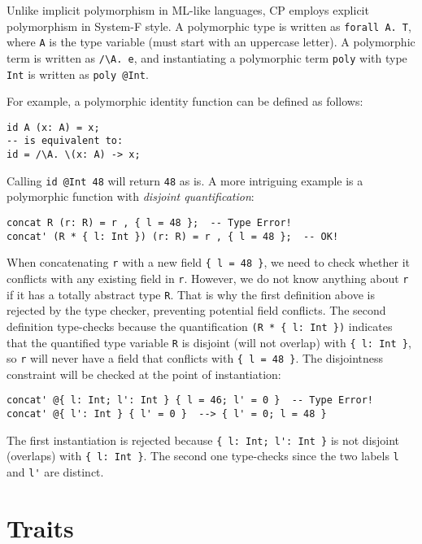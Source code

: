 Unlike implicit polymorphism in ML-like languages, CP employs explicit
polymorphism in System-F style. A polymorphic type is written as
\lstinline{forall A. T}, where \lstinline{A} is the type variable (must start
with an uppercase letter). A polymorphic term is written as \lstinline|/\A. e|,
and instantiating a polymorphic term \lstinline{poly} with type \lstinline{Int}
is written as \lstinline{poly @Int}.

For example, a polymorphic identity function can be defined as follows:
\begin{lstlisting}
id A (x: A) = x;
-- is equivalent to:
id = /\A. \(x: A) -> x;
\end{lstlisting}
Calling \lstinline{id @Int 48} will return \lstinline{48} as is. A more
intriguing example is a polymorphic function with \emph{disjoint
quantification}:
\begin{lstlisting}
concat R (r: R) = r , { l = 48 };  -- Type Error!
concat' (R * { l: Int }) (r: R) = r , { l = 48 };  -- OK!
\end{lstlisting}
When concatenating \lstinline{r} with a new field \lstinline|{ l = 48 }|, we
need to check whether it conflicts with any existing field in \lstinline{r}.
However, we do not know anything about \lstinline{r} if it has a totally
abstract type \lstinline{R}. That is why the first definition above is rejected
by the type checker, preventing potential field conflicts. The second definition
type-checks because the quantification \lstinline|(R * { l: Int })| indicates
that the quantified type variable \lstinline{R} is disjoint (will not overlap)
with \lstinline|{ l: Int }|, so \lstinline{r} will never have a field that
conflicts with \lstinline|{ l = 48 }|. The disjointness constraint will be
checked at the point of instantiation:
\begin{lstlisting}
concat' @{ l: Int; l': Int } { l = 46; l' = 0 }  -- Type Error!
concat' @{ l': Int } { l' = 0 }  --> { l' = 0; l = 48 }
\end{lstlisting}
The first instantiation is rejected because \lstinline|{ l: Int; l': Int }| is
not disjoint (overlaps) with \lstinline|{ l: Int }|. The second one type-checks
since the two labels \lstinline{l} and \lstinline{l'} are distinct.

\section{Traits}

